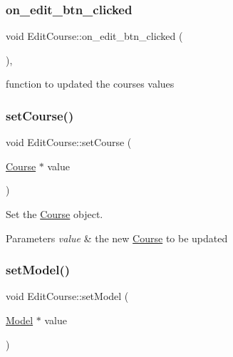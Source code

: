\subsubsection{\texorpdfstring{on\+\_\+edit\+\_\+btn\+\_\+clicked}{on\_edit\_btn\_clicked}}
{\footnotesize\ttfamily void Edit\+Course\+::on\+\_\+edit\+\_\+btn\+\_\+clicked (\begin{DoxyParamCaption}{ }\end{DoxyParamCaption})\hspace{0.3cm}{\ttfamily [private]}, {\ttfamily [slot]}}



function to updated the course\textquotesingle{}s values 

\mbox{\label{classEditCourse_a263030185cb0d1f790b66be18cef630f}} 
\subsubsection{\texorpdfstring{set\+Course()}{setCourse()}}
{\footnotesize\ttfamily void Edit\+Course\+::set\+Course (\begin{DoxyParamCaption}\item[{\hyperlink{classCourse}{Course} $\ast$}]{value }\end{DoxyParamCaption})}



Set the \hyperlink{classCourse}{Course} object. 


\begin{DoxyParams}{Parameters}
{\em value} & the new \hyperlink{classCourse}{Course} to be updated \\
\hline
\end{DoxyParams}
\mbox{\label{classEditCourse_a055cf5be8cfb3e5af3910876e8285d98}} 
\subsubsection{\texorpdfstring{set\+Model()}{setModel()}}
{\footnotesize\ttfamily void Edit\+Course\+::set\+Model (\begin{DoxyParamCaption}\item[{\hyperlink{classModel}{Model} $\ast$}]{value }\end{DoxyParamCaption})}



